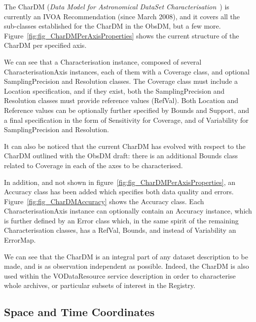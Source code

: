 			 The CharDM (\emph{Data Model for Astronomical DataSet 
			Characterisation}~\cite{2008dmadcrept.....L}) is
			currently an IVOA Recommendation (since March 2008),
			and it covers all the sub-classes established for the
			CharDM in the ObsDM, but a few more.
			Figure~\ref{fig:fig_CharDMPerAxisProperties} shows the
			current structure of the CharDM per specified axis.
			
			 We can see that a Characterisation instance, composed
			of several CharacterisationAxis instances, each of them
			with a Coverage class, and optional SamplingPrecision
			and Resolution classes. The Coverage class must include
			a Location specification, and if they exist, both the
			SamplingPrecision and Resolution classes must provide
			reference values (RefVal). Both Location and Reference
			values can be optionally further specified by Bounds
			and Support, and a final specification in the form of
			Sensitivity for Coverage, and of Variability for
			SamplingPrecision and Resolution.
			
			 It can also be noticed that the current CharDM
			has evolved with respect to the CharDM outlined with
			the ObsDM draft: there is an additional Bounds class
			related to Coverage in each of the axes to be
			characterised.
			
			 In addition, and not shown in 
			figure~\ref{fig:fig_CharDMPerAxisProperties}, an
			Accuracy class has been added which specifies both data
			quality and errors. Figure~\ref{fig:fig_CharDMAccuracy}
			shows the Accuracy class. Each CharacterisationAxis
			instance can optionally contain an Accuracy instance,
			which is further defined by an Error class which, in
			the same spirit of the remaining Characterisation
			classes, has a RefVal, Bounds, and instead of
			Variability an ErrorMap.
			
			 We can see that the CharDM is an integral
			part of any dataset description to be made, and is as
			observation independent as possible. Indeed, the
			CharDM is also used within the VODataResource service
			description in order to characterise whole archives, or
			particular subsets of interest in the Registry.
			
		
		\subsection{Space and Time Coordinates} %
		\label{sub:space_and_time_coordinates}
			
